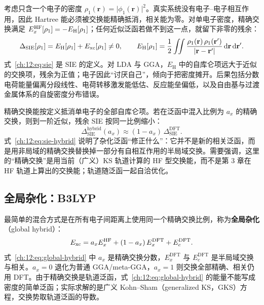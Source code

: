考虑只含一个电子的密度 $\rho_1(\mathbf r)=\lvert\phi_1(\mathbf r)\rvert^2$。真实系统没有电子--电子相互作用，因此 Hartree 能必须被交换能精确抵消，相关能为零。对单电子密度，精确交换满足 $E_x^{\mathrm{HF}}[\rho_1]=-E_{\mathrm H}[\rho_1]$；任何近似泛函若做不到这一点，就留下非零的残余：
\begin{equation}
\Delta_{\mathrm{SIE}}[\rho_1]
= E_{\mathrm H}[\rho_1] + E_{\mathrm{xc}}[\rho_1] \neq 0,
\qquad
E_{\mathrm H}[\rho_1]
= \frac{1}{2}\iint
\frac{\rho_1(\mathbf r)\,\rho_1(\mathbf r')}
{\lvert\mathbf r-\mathbf r'\rvert}
\,\mathrm{d}\mathbf r\,\mathrm{d}\mathbf r'.
\label{ch:12:eq:sie}
\end{equation}
式~\eqref{ch:12:eq:sie} 是 SIE 的定义。对 LDA 与 GGA，$E_{\mathrm H}$ 中的自库仑项远大于近似的交换项，残余为正值；电子因此“讨厌自己”，倾向于把密度摊开。后果包括分数电荷能量偏离分段线性、电荷转移激发能低估、反应能垒偏低，以及自由基与过渡金属体系的自旋密度分布错误。

精确交换能按定义抵消单电子的全部自库仑项。若在泛函中混入比例为 $a_x$ 的精确交换，则到一阶近似，残余 SIE 按同一比例缩小：
\begin{equation}
\Delta_{\mathrm{SIE}}^{\mathrm{hybrid}}(a_x)
\approx (1-a_x)\,\Delta_{\mathrm{SIE}}^{\mathrm{DFT}}.
\label{ch:12:eq:sie-hybrid}
\end{equation}
式~\eqref{ch:12:eq:sie-hybrid} 说明了杂化泛函“修正什么”：它并不是新的相关泛函，而是用非局域的精确交换替换掉一部分有自相互作用的半局域交换。需要强调，这里的“精确交换”是用当前（广义）KS 轨道计算的 HF 型交换能，而不是第 3 章在 HF 轨道上算出的交换能；轨道随泛函一起自洽优化。

\subsection{全局杂化：B3LYP}
\label{ch:12:sec:global}

最简单的混合方式是在所有电子间距离上使用同一个精确交换比例，称为\textbf{全局杂化}（global hybrid）：
\begin{equation}
E_{\mathrm{xc}}
= a_x E_x^{\mathrm{HF}}
+ (1-a_x)\,E_x^{\mathrm{DFT}}
+ E_c^{\mathrm{DFT}}.
\label{ch:12:eq:global-hybrid}
\end{equation}
式~\eqref{ch:12:eq:global-hybrid} 中 $a_x$ 是精确交换分数，$E_x^{\mathrm{DFT}}$ 与 $E_c^{\mathrm{DFT}}$ 是半局域交换与相关。$a_x=0$ 退化为普通 GGA/meta-GGA，$a_x=1$ 则交换全部精确、相关仍用 DFT。由于精确交换是轨道泛函，式~\eqref{ch:12:eq:global-hybrid} 的能量不能写成密度的简单泛函；实际求解的是广义 Kohn--Sham（generalized KS，GKS）方程，交换势取轨道泛函的导数。

